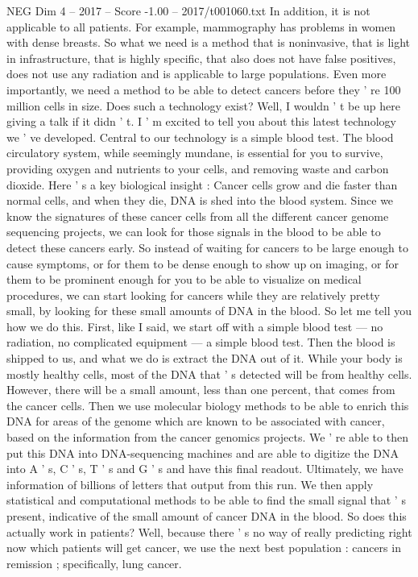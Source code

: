 \begin{textsample}{NEG Dim 4 – 2017 – Score -1.00 – 2017/t001060.txt}
In addition, it is not applicable to all patients.
For example, mammography has problems in women with dense breasts.
So what we need is a method that is noninvasive, that is light in infrastructure, that is highly specific, that also does not have false positives, does not use any radiation and is applicable to large populations.
Even more importantly, we need a method to be able to detect cancers before they ' re 100 million cells in size.
Does such a technology exist?
Well, I wouldn ' t be up here giving a talk if it didn ' t.
I ' m excited to tell you about this latest technology we ' ve developed.
Central to our technology is a simple blood test.
The blood circulatory system, while seemingly mundane, is essential for you to survive, providing oxygen and nutrients to your cells, and removing waste and carbon dioxide.
Here ' s a key biological insight : Cancer cells grow and die faster than normal cells, and when they die, DNA is shed into the blood system.
Since we know the signatures of these cancer cells from all the different cancer genome sequencing projects, we can look for those signals in the blood to be able to detect these cancers early.
So instead of waiting for cancers to be large enough to cause symptoms, or for them to be dense enough to show up on imaging, or for them to be prominent enough for you to be able to visualize on medical procedures, we can start looking for cancers while they are relatively pretty small, by looking for these small amounts of DNA in the blood.
So let me tell you how we do this.
First, like I said, we start off with a simple blood test — no radiation, no complicated equipment — a simple blood test.
Then the blood is shipped to us, and what we do is extract the DNA out of it.
While your body is mostly healthy cells, most of the DNA that ' s detected will be from healthy cells.
However, there will be a small amount, less than one percent, that comes from the cancer cells.
Then we use molecular biology methods to be able to enrich this DNA for areas of the genome which are known to be associated with cancer, based on the information from the cancer genomics projects.
We ' re able to then put this DNA into DNA-sequencing machines and are able to digitize the DNA into A ' s, C ' s, T ' s and G ' s and have this final readout.
Ultimately, we have information of billions of letters that output from this run.
We then apply statistical and computational methods to be able to find the small signal that ' s present, indicative of the small amount of cancer DNA in the blood.
So does this actually work in patients?
Well, because there ' s no way of really predicting right now which patients will get cancer, we use the next best population : cancers in remission ; specifically, lung cancer.

\end{textsample}
